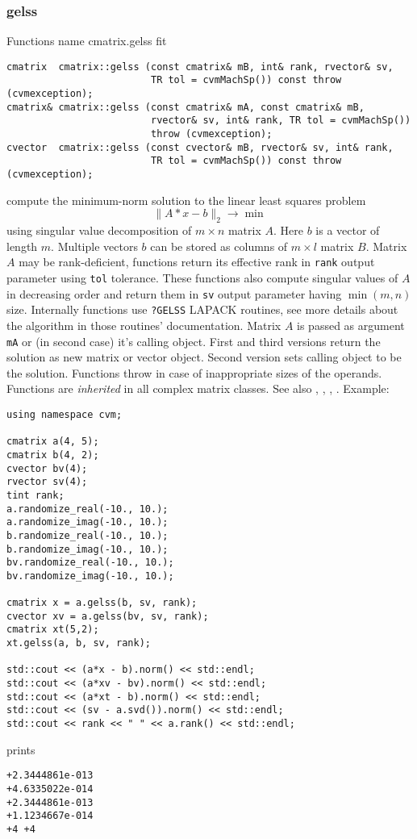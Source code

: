 \subsubsection{gelss}
Functions%
\pdfdest name {cmatrix.gelss} fit
\begin{verbatim}
cmatrix  cmatrix::gelss (const cmatrix& mB, int& rank, rvector& sv,
                         TR tol = cvmMachSp()) const throw (cvmexception);
cmatrix& cmatrix::gelss (const cmatrix& mA, const cmatrix& mB, 
                         rvector& sv, int& rank, TR tol = cvmMachSp()) 
                         throw (cvmexception);
cvector  cmatrix::gelss (const cvector& mB, rvector& sv, int& rank,
                         TR tol = cvmMachSp()) const throw (cvmexception);
\end{verbatim}
compute the minimum-norm solution to the linear
least squares problem 
\begin{equation*}
\|A*x-b\|_2\to\min
\end{equation*}
using singular value decomposition  of $m\times n$ matrix $A$.
Here $b$ is a vector of length $m$.
Multiple vectors $b$ can be stored as columns of $m\times l$ matrix $B$.
Matrix $A$ may be rank-deficient, functions return its effective rank in \verb"rank"
output parameter using \verb"tol" tolerance. These functions also compute 
singular values of $A$ in decreasing order and return them in \verb"sv" output parameter
having $\min(m,n)$ size.
Internally functions use \verb"?GELSS" LAPACK routines, see more details
about the algorithm in those routines' documentation.
Matrix $A$ is passed as  argument \verb"mA" or (in second case) it's  calling object.
First and third versions return the solution as  new matrix or vector object.
Second version sets calling object to be the solution.
Functions throw
in case of inappropriate sizes of the operands.
Functions are \emph{inherited} in all complex matrix classes.
See also , ,
, .
Example:

\begin{Verbatim}
using namespace cvm;

cmatrix a(4, 5);
cmatrix b(4, 2);
cvector bv(4);
rvector sv(4);
tint rank;
a.randomize_real(-10., 10.);
a.randomize_imag(-10., 10.);
b.randomize_real(-10., 10.);
b.randomize_imag(-10., 10.);
bv.randomize_real(-10., 10.);
bv.randomize_imag(-10., 10.);

cmatrix x = a.gelss(b, sv, rank);
cvector xv = a.gelss(bv, sv, rank);
cmatrix xt(5,2);
xt.gelss(a, b, sv, rank);

std::cout << (a*x - b).norm() << std::endl;
std::cout << (a*xv - bv).norm() << std::endl;
std::cout << (a*xt - b).norm() << std::endl;
std::cout << (sv - a.svd()).norm() << std::endl;
std::cout << rank << " " << a.rank() << std::endl;
\end{Verbatim}
prints
\begin{Verbatim}
+2.3444861e-013
+4.6335022e-014
+2.3444861e-013
+1.1234667e-014
+4 +4
\end{Verbatim}
\newpage






